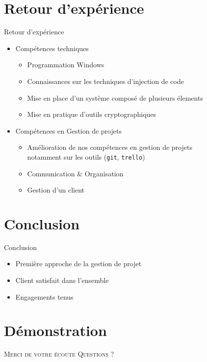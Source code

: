 \documentclass{cubeamer}
\begin{document}
\section{Retour d'expérience}

\begin{frame}{Retour d'expérience}
    \begin{itemize}
        \item Compétences techniques 
            \begin{itemize}
                \item Programmation Windows 
                \item Connaissances sur les techniques d'injection de code
                \item Mise en place d'un système composé de plusieurs élements
                \item Mise en pratique d'outils cryptographiques
            \end{itemize}
        \item Compétences en Gestion de projets
             \begin{itemize}
                \item Amélioration de nos compétences en gestion de projets \\
                  notamment sur les outils (\verb:git:, \verb:trello:)
                \item Communication \& Organisation
                \item Gestion d'un client
            \end{itemize}           
    \end{itemize}
\end{frame}

\section{Conclusion}

\begin{frame}{Conclusion}
    \begin{itemize}
        \item Première approche de la gestion de projet 
        \item Client satisfait dans l'ensemble
        \item Engagements tenus
    \end{itemize}
\end{frame}

\section{Démonstration}

\begin{frame}[standout]
    \Huge\textsc{Merci de votre écoute}
    \vfill
    \LARGE\textsc{Questions ?}
\end{frame}
\end{document}
